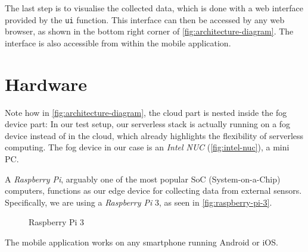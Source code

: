 The last step is to visualise the collected data, which is done with a web interface provided by the
\texttt{ui} function. This interface can then be accessed by any web browser, as shown in the bottom
right corner of \autoref{fig:architecture-diagram}. The interface is also accessible from within
the mobile application.

\section{Hardware}

Note how in \autoref{fig:architecture-diagram}, the cloud part is nested inside the fog device part:
In our test setup, our serverless stack is actually running on a fog device instead of in the cloud,
which already highlights the flexibility of serverless computing. The fog device in our case is an
\textit{Intel NUC} (\autoref{fig:intel-nuc}), a mini PC.

\begin{figure}[H]
  \centering
  \caption{}
  \label{fig:intel-nuc}
\end{figure}

A \textit{Raspberry Pi}, arguably one of the most popular SoC (System-on-a-Chip) computers, functions as our
edge device for collecting data from external sensors. Specifically, we are using a \textit{Raspberry Pi} 3,
as seen in \autoref{fig:raspberry-pi-3}.

\begin{figure}[H]
  \centering
  \caption{Raspberry Pi 3}
  \label{fig:raspberry-pi-3}
\end{figure}

The mobile application works on any smartphone running Android or iOS.
